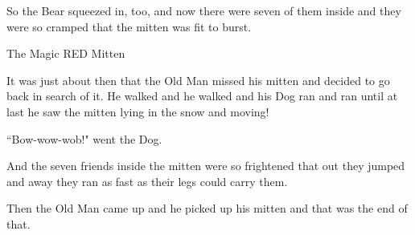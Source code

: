 \documentclass{article}
\begin{document}
So the Bear squeezed in, too, and now there were seven of them inside and they were so cramped that the mitten was fit to burst.

The Magic RED Mitten

It was just about then that the Old Man missed his mitten and decided to go back in search of it. He walked and he walked and his Dog ran and ran until at last he saw the mitten lying in the snow and moving!

``Bow-wow-wob!" went the Dog.

And the seven friends inside the mitten were so frightened that out they jumped and away they ran as fast as their legs could carry them.

Then the Old Man came up and he picked up his mitten and that was the end of that.
\end{document}
